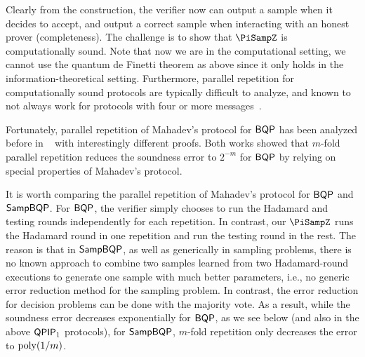 Clearly from the construction, the verifier now can output a sample when it decides to accept, and output a correct sample when interacting with an honest prover (completeness). The challenge is to show that $\PiSampZ$ is computationally sound. Note that now we are in the computational setting, we cannot use the quantum de Finetti theorem as above since it only holds in the information-theoretical setting. Furthermore, parallel repetition for computationally sound protocols are typically difficult to analyze, and known to not always work for protocols with four or more messages~\cite{BIN97,PW12}.

Fortunately, parallel repetition of Mahadev's protocol for $\operatorname{\mathsf{BQP}}$ has been analyzed before in ~\cite{arXiv:ChiaChungYam19, arXiv:AlaChiHun19} with interestingly different proofs. Both works showed that $m$-fold parallel repetition reduces the soundness error to $2^{-m}$ for $\operatorname{\mathsf{BQP}}$ by relying on special properties of Mahadev's protocol. 

It is worth comparing the parallel repetition of Mahadev's protocol for $\operatorname{\mathsf{BQP}}$ and $\operatorname{\mathsf{SampBQP}}$. For $\operatorname{\mathsf{BQP}}$, the verifier simply chooses to run the Hadamard and testing rounds independently for each repetition. In contrast, our $\PiSampZ$ runs the Hadamard round in one repetition and run the testing round in the rest. The reason is that in $\operatorname{\mathsf{SampBQP}}$, as well as generically in sampling problems, there is no known approach to combine two samples learned from two Hadamard-round executions to generate one sample with much better parameters, i.e., no generic error reduction method for the sampling problem. 
In contrast, the error reduction for decision problems can be done with the majority vote. 
As a result, while the soundness error decreases exponentially for $\operatorname{\mathsf{BQP}}$, as we see below (and also in the above $\operatorname{\mathsf{QPIP}}_1$ protocols), for $\operatorname{\mathsf{SampBQP}}$, $m$-fold repetition only decreases the error to $\operatorname*{\operatorname{poly}}(1/m)$. 

